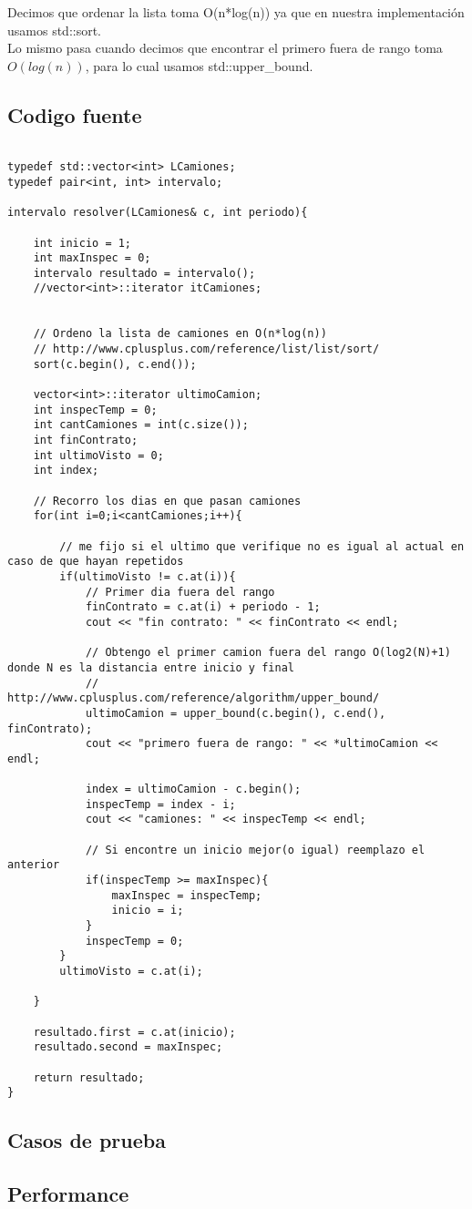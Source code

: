 Decimos que ordenar la lista toma O(n*log(n)) ya que en nuestra implementaci\'on usamos std::sort.\cite{sort}\\
Lo mismo pasa cuando decimos que encontrar el primero fuera de rango toma $O(log(n))$, para lo cual usamos std::upper\_bound.\cite{upper} \\ 

\subsection{Codigo fuente}

\begin{lstlisting}

typedef std::vector<int> LCamiones;
typedef pair<int, int> intervalo;

intervalo resolver(LCamiones& c, int periodo){
	
	int inicio = 1;
	int maxInspec = 0;
	intervalo resultado = intervalo();
	//vector<int>::iterator itCamiones;


	// Ordeno la lista de camiones en O(n*log(n))
	// http://www.cplusplus.com/reference/list/list/sort/
	sort(c.begin(), c.end());

	vector<int>::iterator ultimoCamion;
	int inspecTemp = 0;
	int cantCamiones = int(c.size());
	int finContrato;
	int ultimoVisto = 0;
	int index;

	// Recorro los dias en que pasan camiones
	for(int i=0;i<cantCamiones;i++){
		
		// me fijo si el ultimo que verifique no es igual al actual en caso de que hayan repetidos
		if(ultimoVisto != c.at(i)){
			// Primer dia fuera del rango
			finContrato = c.at(i) + periodo - 1;
			cout << "fin contrato: " << finContrato << endl;
			
			// Obtengo el primer camion fuera del rango O(log2(N)+1) donde N es la distancia entre inicio y final
			// http://www.cplusplus.com/reference/algorithm/upper_bound/
			ultimoCamion = upper_bound(c.begin(), c.end(), finContrato);
			cout << "primero fuera de rango: " << *ultimoCamion << endl;
			
			index = ultimoCamion - c.begin();
			inspecTemp = index - i;
			cout << "camiones: " << inspecTemp << endl;

			// Si encontre un inicio mejor(o igual) reemplazo el anterior
			if(inspecTemp >= maxInspec){
				maxInspec = inspecTemp;
				inicio = i;
			}
			inspecTemp = 0;
		}
		ultimoVisto = c.at(i);

	}

	resultado.first = c.at(inicio);
	resultado.second = maxInspec;
	
	return resultado;
}

\end{lstlisting}

\subsection{Casos de prueba}

\subsection{Performance}
